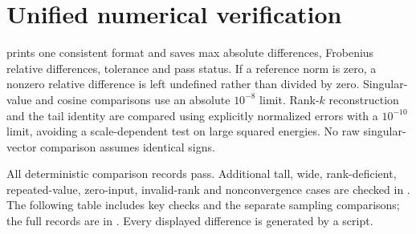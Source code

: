 \section{Unified numerical verification}
 prints one consistent format and saves
max absolute differences, Frobenius relative differences, tolerance and
pass status. If a reference norm is zero, a nonzero relative difference
is left undefined rather than divided by zero.
Singular-value and cosine comparisons use an absolute $10^{-8}$ limit.
Rank-$k$ reconstruction and the tail identity are compared using
explicitly normalized errors with a $10^{-10}$ limit, avoiding a
scale-dependent test on large squared energies. No raw singular-vector
comparison assumes identical signs.

All \VerificationCount{} deterministic comparison records pass.
Additional tall, wide, rank-deficient, repeated-value, zero-input,
invalid-rank and nonconvergence cases are checked in
. The following table includes key checks
and the separate sampling comparisons; the full records are in
.
Every displayed difference is generated by a script.

